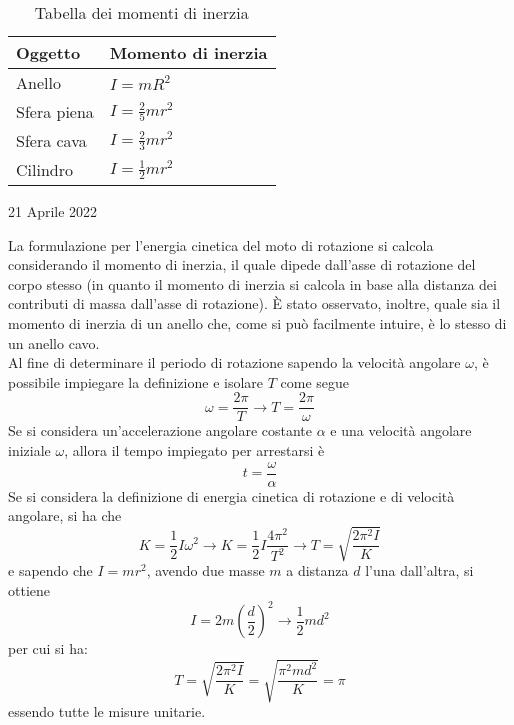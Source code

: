 \documentclass[a4paper]{extarticle}
\renewcommand\arraystretch{}
\begin{document}
\begin{table}[H]
  \centering
  \setlength{\tabcolsep}{4pt}
  \renewcommand{\arraystretch}{2}
  \begin{tabular}{|l|l|}
    \hline
    \textbf{Oggetto} & \textbf{Momento di inerzia}\\
    \hline
    Anello & \hspace{2em} $\displaystyle{I=m R^2}$\\
    \hline
    Sfera piena & \hspace{2em} $\displaystyle{I=\frac{2}{5} m r^2}$\\
    \hline
    Sfera cava & \hspace{2em} $\displaystyle{I=\frac{2}{3} m r^2}$\\
    \hline
    Cilindro & \hspace{2em} $\displaystyle{I=\frac{1}{2} m r^2}$\\
    \hline
  \end{tabular}
  \caption{Tabella dei momenti di inerzia}
  \label{tab:tabella_momenti_inerzia}
\end{table}

\newpage
\noindent
\begin{center}
  21 Aprile 2022
\end{center}
La formulazione per l'energia cinetica del moto di rotazione si calcola considerando il momento di inerzia, il quale dipede dall'asse di rotazione del corpo stesso (in quanto il momento di inerzia si calcola in base alla distanza dei contributi di massa dall'asse di rotazione). È stato osservato, inoltre, quale sia il momento di inerzia di un anello che, come si può facilmente intuire, è lo stesso di un anello cavo.\\
Al fine di determinare il periodo di rotazione sapendo la velocità angolare $\omega$, è possibile impiegare la definizione e isolare $T$ come segue
\[\omega=\frac{2\pi}{T} \longrightarrow T=\frac{2\pi}{\omega}\]
Se si considera un'accelerazione angolare costante $\alpha$ e una velocità angolare iniziale $\omega$, allora il tempo impiegato per arrestarsi è
\[t=\frac{\omega}{\alpha}\]
Se si considera la definizione di energia cinetica di rotazione e di velocità angolare, si ha che
\[K=\frac{1}{2}I \omega^2 \longrightarrow K=\frac{1}{2} I \frac{4\pi^2}{T^2} \longrightarrow T=\sqrt{\frac{2\pi^2 I}{K}}\]
e sapendo che $I=m r^2$, avendo due masse $m$ a distanza $d$ l'una dall'altra, si ottiene
\[I=2m \left(\frac{d}{2}\right)^2 \longrightarrow \frac{1}{2}md^2\]
per cui si ha:
\[T=\sqrt{\frac{2\pi^2 I}{K}}=\sqrt{\frac{\pi^2 m d^2}{K}} = \pi\]
essendo tutte le misure unitarie.
\end{document}
